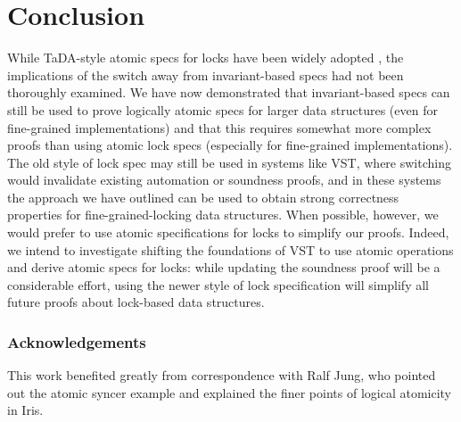 \documentclass[runningheads]{llncs}
\begin{document}


\section{Conclusion}
\label{conclusion}
While TaDA-style atomic specs for locks have been widely adopted%
, the implications of the switch away from invariant-based specs had not been thoroughly examined. We have now demonstrated that invariant-based specs can still be used to prove logically atomic specs for larger data structures (even for fine-grained implementations) and that this requires somewhat more complex proofs than using atomic lock specs (especially for fine-grained implementations). The old style of lock spec may still be used in systems like VST, where switching would invalidate existing automation or soundness proofs, and in these systems the approach we have outlined can be used to obtain strong correctness properties for fine-grained-locking data structures. When possible, however, we would prefer to use atomic specifications for locks to simplify our proofs. Indeed, we intend to investigate shifting the foundations of VST to use atomic operations and derive atomic specs for locks: while updating the soundness proof will be a considerable effort, using the newer style of lock specification will simplify all future proofs about lock-based data structures.

\subsubsection{Acknowledgements} This work benefited greatly from correspondence with Ralf Jung, who pointed out the atomic syncer example and explained the finer points of logical atomicity in Iris.


\end{document}
